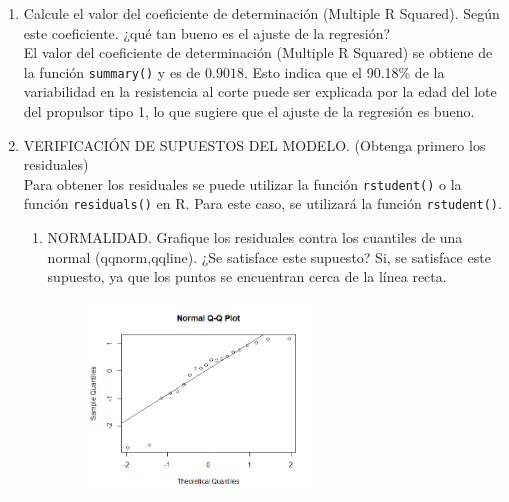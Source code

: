 \documentclass[12pt,a4paper]{article}
\begin{document}
\begin{enumerate}
  \item Calcule el valor del coeficiente de determinaci\'on (Multiple R Squared). Seg\'un este coeficiente. ¿qu\'e tan bueno es el ajuste de la regresi\'on?
  \\
  El valor del coeficiente de determinaci\'on (Multiple R Squared) se obtiene de la funci\'on \texttt{summary()} y es de $0.9018$. Esto indica que el 90.18\% de la variabilidad en la resistencia al corte puede ser explicada por la edad del lote del propulsor tipo 1, lo que sugiere que el ajuste de la regresi\'on es bueno.
  
  \item VERIFICACI\'ON DE SUPUESTOS DEL MODELO. (Obtenga primero los residuales)
  \\
  Para obtener los residuales se puede utilizar la funci\'on \texttt{rstudent()} o la funci\'on \texttt{residuals()} en R. Para este caso, se utilizar\'a la funci\'on \texttt{rstudent()}.
  \begin{enumerate}
    \item NORMALIDAD. Grafique los residuales contra los cuantiles de una normal (qqnorm,qqline). ¿Se satisface este supuesto? Si, se satisface este supuesto, ya que los puntos se encuentran cerca de la l\'inea recta.
    \begin{figure}[H]
      \centering
      \includegraphics[width=0.6\textwidth]{img/Normalidad.png}
    \end{figure}


\end{enumerate}
\end{enumerate}
\end{document}
